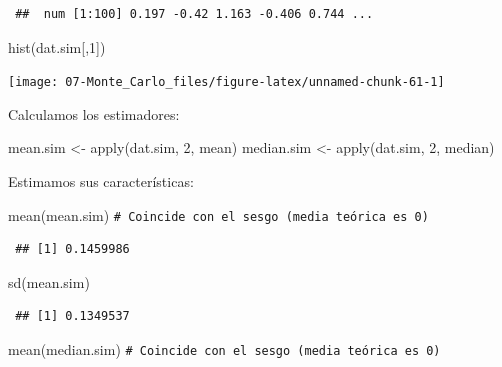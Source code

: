 \documentclass[
]{book}
\newenvironment{Shaded}{\begin{snugshade}}{\end{snugshade}}
\newcommand{\CommentTok}[1]{\textcolor[rgb]{0.56,0.35,0.01}{\textit{#1}}}
\newcommand{\DecValTok}[1]{\textcolor[rgb]{0.00,0.00,0.81}{#1}}
\newcommand{\FunctionTok}[1]{\textcolor[rgb]{0.00,0.00,0.00}{#1}}
\newcommand{\NormalTok}[1]{#1}
\newcommand{\OtherTok}[1]{\textcolor[rgb]{0.56,0.35,0.01}{#1}}
\theoremstyle{break}
\theoremstyle{nonumberplain}
\renewcommand{\CommentTok}[1]{\textcolor[rgb]{0.41,0.41,0.41}{\texttt{#1}}}
\begin{document}
\begin{enumerate}
\begin{verbatim}
 ##  num [1:100] 0.197 -0.42 1.163 -0.406 0.744 ...
\end{verbatim}

\begin{Shaded}
\begin{Highlighting}[]
\FunctionTok{hist}\NormalTok{(dat.sim[,}\DecValTok{1}\NormalTok{])}
\end{Highlighting}
\end{Shaded}

  \begin{center}\texttt{[image: 07-Monte\_Carlo\_files/figure-latex/unnamed-chunk-61-1]} \end{center}

  Calculamos los estimadores:

\begin{Shaded}
\begin{Highlighting}[]
\NormalTok{mean.sim }\OtherTok{\textless{}{-}} \FunctionTok{apply}\NormalTok{(dat.sim, }\DecValTok{2}\NormalTok{, mean)}
\NormalTok{median.sim }\OtherTok{\textless{}{-}} \FunctionTok{apply}\NormalTok{(dat.sim, }\DecValTok{2}\NormalTok{, median)}
\end{Highlighting}
\end{Shaded}

  Estimamos sus características:

\begin{Shaded}
\begin{Highlighting}[]
\FunctionTok{mean}\NormalTok{(mean.sim) }\CommentTok{\# Coincide con el sesgo (media teórica es 0)}
\end{Highlighting}
\end{Shaded}

\begin{verbatim}
 ## [1] 0.1459986
\end{verbatim}

\begin{Shaded}
\begin{Highlighting}[]
\FunctionTok{sd}\NormalTok{(mean.sim)}
\end{Highlighting}
\end{Shaded}

\begin{verbatim}
 ## [1] 0.1349537
\end{verbatim}

\begin{Shaded}
\begin{Highlighting}[]
\FunctionTok{mean}\NormalTok{(median.sim) }\CommentTok{\# Coincide con el sesgo (media teórica es 0)}
\end{Highlighting}
\end{Shaded}


\end{enumerate}
\end{document}
